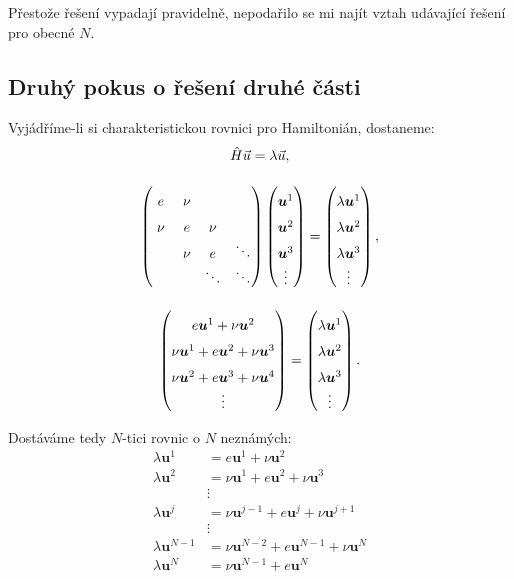 \documentclass[10pt,a4paper]{article}
\def\ph{\phantom}
\def\vph{\vphantom}
\newcommand{\mat}[1]{
    \begin{pmatrix}
        #1
    \end{pmatrix}
}
\begin{document}
Přestože řešení vypadají pravidelně, nepodařilo se mi najít vztah udávající řešení pro obecné $N$.

\subsection{Druhý pokus o řešení druhé části}
Vyjádříme-li si charakteristickou rovnici pro Hamiltonián, dostaneme:
\begin{gather*}
    \hat H \vec u = \lambda \vec u,
    \\[10pt]
    \mat{
        e   & \nu & \vph{\ddots} \\
        \nu & e   & \nu  & \vph{\ddots} \\
            & \nu & e    & \ddots \\
        \ph{\ddots} &     & \ddots & \ddots
    }
    \mat{
        \bm{u}^1 \vph{\ddots} \\
        \bm{u}^2 \vph{\ddots} \\
        \bm{u}^3 \vph{\ddots} \\
        \vdots \vph{\ddots}
    }
    =
    \mat{
        \lambda \bm{u}^1 \vph{\ddots} \\
        \lambda \bm{u}^2 \vph{\ddots} \\
        \lambda \bm{u}^3 \vph{\ddots} \\
        \vdots \vph{\ddots}
    },
    \\[10pt]
    \mat{
        e \bm{u}^1 + \nu \bm{u}^2 \vph{\ddots} \\
        \nu \bm{u}^1 + e \bm{u}^2 + \nu \bm{u}^3 \vph{\ddots} \\
        \nu \bm{u}^2 + e \bm{u}^3 + \nu \bm{u}^4 \vph{\ddots} \\
        \vdots \vph{\ddots}
    }
    =
    \mat{
        \lambda \bm{u}^1 \vph{\ddots} \\
        \lambda \bm{u}^2 \vph{\ddots} \\
        \lambda \bm{u}^3 \vph{\ddots} \\
        \vdots \vph{\ddots}
    }.
\end{gather*}

Dostáváme tedy $N$-tici rovnic o $N$ neznámých:
\begin{align*}
    \lambda \bm{u}^1 &= e \bm{u}^1 + \nu \bm{u}^2 \\
    \lambda \bm{u}^2 &= \nu \bm{u}^1 + e \bm{u}^2 + \nu \bm{u}^3 \\
    &\vdots \\
    \lambda \bm{u}^j &= \nu \bm{u}^{j-1} + e \bm{u}^j + \nu \bm{u}^{j+1} \\
    &\vdots \\
    \lambda \bm{u}^{N-1} &= \nu \bm{u}^{N-2} + e \bm{u}^{N-1} + \nu \bm{u}^N \\
    \lambda \bm{u}^N &= \nu \bm{u}^{N-1} + e \bm{u}^N
\end{align*}
\end{document}

